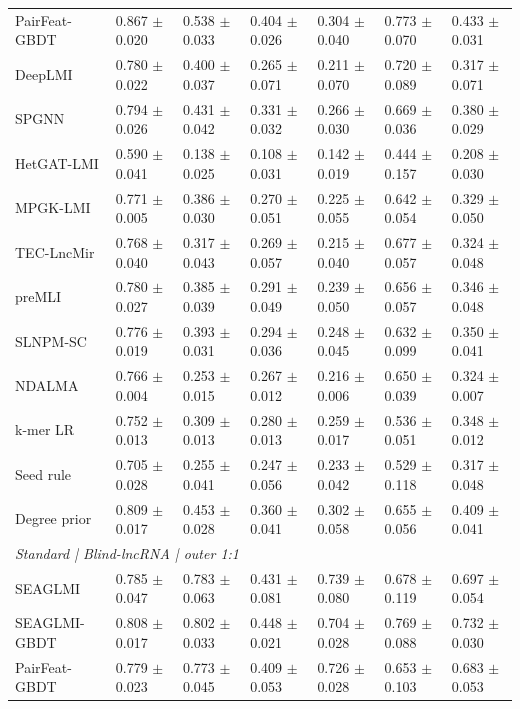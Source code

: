 \begin{landscape}
{\begin{longtable}{lllllll}
PairFeat-GBDT & 0.867 $\pm$ 0.020 & 0.538 $\pm$ 0.033 & 0.404 $\pm$ 0.026 & 0.304 $\pm$ 0.040 & 0.773 $\pm$ 0.070 & 0.433 $\pm$ 0.031 \\
DeepLMI & 0.780 $\pm$ 0.022 & 0.400 $\pm$ 0.037 & 0.265 $\pm$ 0.071 & 0.211 $\pm$ 0.070 & 0.720 $\pm$ 0.089 & 0.317 $\pm$ 0.071 \\
SPGNN & 0.794 $\pm$ 0.026 & 0.431 $\pm$ 0.042 & 0.331 $\pm$ 0.032 & 0.266 $\pm$ 0.030 & 0.669 $\pm$ 0.036 & 0.380 $\pm$ 0.029 \\
HetGAT-LMI & 0.590 $\pm$ 0.041 & 0.138 $\pm$ 0.025 & 0.108 $\pm$ 0.031 & 0.142 $\pm$ 0.019 & 0.444 $\pm$ 0.157 & 0.208 $\pm$ 0.030 \\
MPGK-LMI & 0.771 $\pm$ 0.005 & 0.386 $\pm$ 0.030 & 0.270 $\pm$ 0.051 & 0.225 $\pm$ 0.055 & 0.642 $\pm$ 0.054 & 0.329 $\pm$ 0.050 \\
TEC-LncMir & 0.768 $\pm$ 0.040 & 0.317 $\pm$ 0.043 & 0.269 $\pm$ 0.057 & 0.215 $\pm$ 0.040 & 0.677 $\pm$ 0.057 & 0.324 $\pm$ 0.048 \\
preMLI & 0.780 $\pm$ 0.027 & 0.385 $\pm$ 0.039 & 0.291 $\pm$ 0.049 & 0.239 $\pm$ 0.050 & 0.656 $\pm$ 0.057 & 0.346 $\pm$ 0.048 \\
SLNPM-SC & 0.776 $\pm$ 0.019 & 0.393 $\pm$ 0.031 & 0.294 $\pm$ 0.036 & 0.248 $\pm$ 0.045 & 0.632 $\pm$ 0.099 & 0.350 $\pm$ 0.041 \\
NDALMA & 0.766 $\pm$ 0.004 & 0.253 $\pm$ 0.015 & 0.267 $\pm$ 0.012 & 0.216 $\pm$ 0.006 & 0.650 $\pm$ 0.039 & 0.324 $\pm$ 0.007 \\
k-mer LR & 0.752 $\pm$ 0.013 & 0.309 $\pm$ 0.013 & 0.280 $\pm$ 0.013 & 0.259 $\pm$ 0.017 & 0.536 $\pm$ 0.051 & 0.348 $\pm$ 0.012 \\
Seed rule & 0.705 $\pm$ 0.028 & 0.255 $\pm$ 0.041 & 0.247 $\pm$ 0.056 & 0.233 $\pm$ 0.042 & 0.529 $\pm$ 0.118 & 0.317 $\pm$ 0.048 \\
Degree prior & 0.809 $\pm$ 0.017 & 0.453 $\pm$ 0.028 & 0.360 $\pm$ 0.041 & 0.302 $\pm$ 0.058 & 0.655 $\pm$ 0.056 & 0.409 $\pm$ 0.041 \\
\multicolumn{7}{l}{\textit{Standard | Blind-lncRNA | outer 1:1}}\\
SEAGLMI & 0.785 $\pm$ 0.047 & 0.783 $\pm$ 0.063 & 0.431 $\pm$ 0.081 & 0.739 $\pm$ 0.080 & 0.678 $\pm$ 0.119 & 0.697 $\pm$ 0.054 \\
SEAGLMI-GBDT & 0.808 $\pm$ 0.017 & 0.802 $\pm$ 0.033 & 0.448 $\pm$ 0.021 & 0.704 $\pm$ 0.028 & 0.769 $\pm$ 0.088 & 0.732 $\pm$ 0.030 \\
PairFeat-GBDT & 0.779 $\pm$ 0.023 & 0.773 $\pm$ 0.045 & 0.409 $\pm$ 0.053 & 0.726 $\pm$ 0.028 & 0.653 $\pm$ 0.103 & 0.683 $\pm$ 0.053 \\

\end{longtable}}
\end{landscape}
